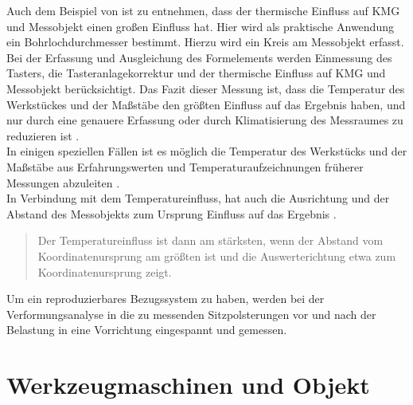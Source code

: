 Auch dem Beispiel von \cite{Hernla2006} ist zu entnehmen, dass der thermische Einfluss auf KMG und Messobjekt einen großen Einfluss hat. Hier wird als praktische Anwendung ein Bohrlochdurchmesser bestimmt. Hierzu wird ein Kreis am Messobjekt erfasst. Bei der Erfassung und Ausgleichung des Formelements werden Einmessung des Tasters, die Tasteranlagekorrektur und der thermische Einfluss auf KMG und Messobjekt berücksichtigt. Das Fazit dieser Messung ist, dass die Temperatur des Werkstückes und der Maßstäbe den größten Einfluss auf das Ergebnis haben, und nur durch eine genauere Erfassung oder durch Klimatisierung des Messraumes zu reduzieren ist \cite{Hernla2006}.\\
In einigen speziellen Fällen ist es möglich die Temperatur des Werkstücks und der Maßstäbe aus Erfahrungswerten und Temperaturaufzeichnungen früherer Messungen abzuleiten \cite{Hernla2008}.\\
In Verbindung mit dem Temperatureinfluss, hat auch die Ausrichtung und der Abstand des Messobjekts zum Ursprung Einfluss auf das Ergebnis \cite{Hernla2013}.
\begin{quotation}
Der  Temperatureinfluss ist dann am stärksten, wenn der Abstand vom Koordinatenursprung am größten 
ist und die Auswerterichtung etwa zum Koordinatenursprung zeigt. \cite{Hernla2013}
\end{quotation}
Um ein reproduzierbares Bezugssystem zu haben, werden bei der Verformungsanalyse in \cite{Hernla2013} die zu messenden Sitzpolsterungen vor und nach der Belastung in eine Vorrichtung eingespannt und gemessen. 

\section{Werkzeugmaschinen und Objekt}\label{sec:Werkzeugmaschine}

